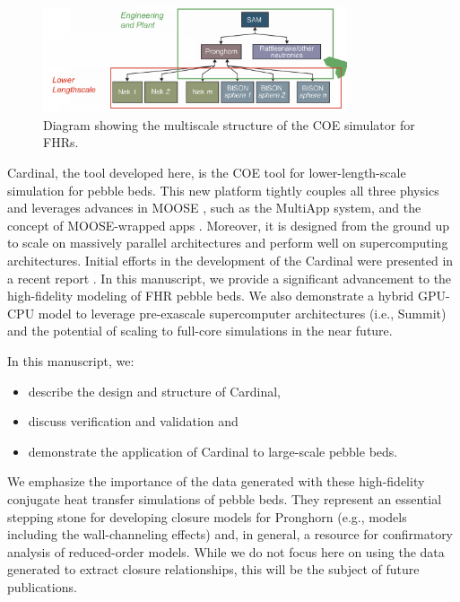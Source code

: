 \begin{figure}[!h]
\centering
\includegraphics[clip=true,width=0.8\textwidth]{Figures/fhr_graph}
\caption{Diagram showing the multiscale structure of the COE simulator for FHRs.}
\label{f:fhr1}
\end{figure}

Cardinal, the tool developed here, is the COE tool for lower-length-scale simulation for pebble beds. This new platform tightly couples all three physics and leverages advances in MOOSE \cite{gaston2009moose, permann2020moose}, such as the MultiApp system, and the concept of MOOSE-wrapped apps \cite{gaston2015physics}. Moreover, it is designed from the ground up to scale on massively parallel architectures and perform well on supercomputing architectures. Initial efforts in the development of the Cardinal were presented in a recent report \cite{cardinal}. In this manuscript, we provide a significant advancement to the high-fidelity modeling of FHR pebble beds. We also demonstrate a hybrid GPU-CPU model to leverage pre-exascale supercomputer architectures (i.e., Summit) and the potential of scaling to full-core simulations in the near future.

In this manuscript, we:

\begin{itemize}
\item describe the design and structure of Cardinal,
\item discuss verification and validation and
\item demonstrate the application of Cardinal to large-scale pebble beds.
\end{itemize}

We emphasize the importance of the data generated with these high-fidelity conjugate heat transfer simulations of pebble beds. They represent an essential stepping stone for developing closure models for Pronghorn (e.g., models including the wall-channeling effects) and, in general, a resource for confirmatory analysis of reduced-order models. While we do not focus here on using the data generated to extract closure relationships, this will be the subject of future publications.
